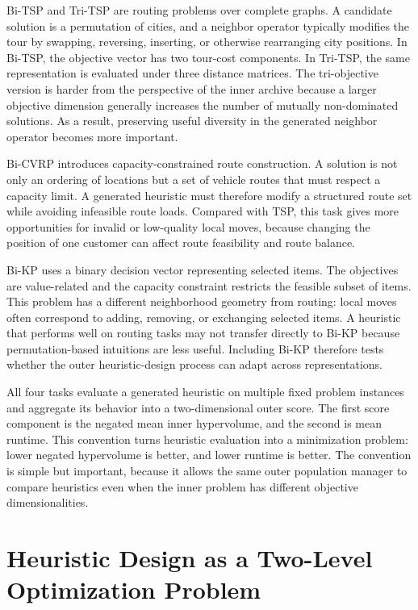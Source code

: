 \documentclass[../main.tex]{subfiles}
\begin{document}
Bi-TSP and Tri-TSP are routing problems over complete graphs. A candidate solution is a permutation of cities, and a neighbor operator typically modifies the tour by swapping, reversing, inserting, or otherwise rearranging city positions. In Bi-TSP, the objective vector has two tour-cost components. In Tri-TSP, the same representation is evaluated under three distance matrices. The tri-objective version is harder from the perspective of the inner archive because a larger objective dimension generally increases the number of mutually non-dominated solutions. As a result, preserving useful diversity in the generated neighbor operator becomes more important.

Bi-CVRP introduces capacity-constrained route construction. A solution is not only an ordering of locations but a set of vehicle routes that must respect a capacity limit. A generated heuristic must therefore modify a structured route set while avoiding infeasible route loads. Compared with TSP, this task gives more opportunities for invalid or low-quality local moves, because changing the position of one customer can affect route feasibility and route balance.

Bi-KP uses a binary decision vector representing selected items. The objectives are value-related and the capacity constraint restricts the feasible subset of items. This problem has a different neighborhood geometry from routing: local moves often correspond to adding, removing, or exchanging selected items. A heuristic that performs well on routing tasks may not transfer directly to Bi-KP because permutation-based intuitions are less useful. Including Bi-KP therefore tests whether the outer heuristic-design process can adapt across representations.

All four tasks evaluate a generated heuristic on multiple fixed problem instances and aggregate its behavior into a two-dimensional outer score. The first score component is the negated mean inner hypervolume, and the second is mean runtime. This convention turns heuristic evaluation into a minimization problem: lower negated hypervolume is better, and lower runtime is better. The convention is simple but important, because it allows the same outer population manager to compare heuristics even when the inner problem has different objective dimensionalities.

\section{Heuristic Design as a Two-Level Optimization Problem}
\end{document}
